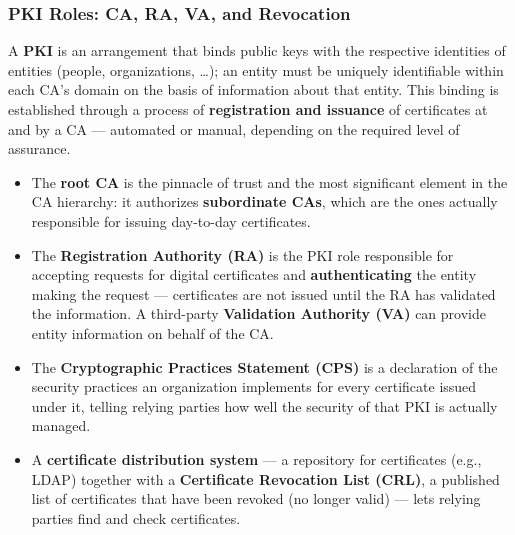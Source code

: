 \documentclass[12pt, a4paper]{article}
\begin{document}
\subsubsection{PKI Roles: CA, RA, VA, and Revocation}
A \textbf{PKI} is an arrangement that binds public keys with the respective identities of entities (people, organizations, \dots); an entity must be uniquely identifiable within each CA's domain on the basis of information about that entity. This binding is established through a process of \textbf{registration and issuance} of certificates at and by a CA --- automated or manual, depending on the required level of assurance.
\begin{itemize}
    \item The \textbf{root CA} is the pinnacle of trust and the most significant element in the CA hierarchy: it authorizes \textbf{subordinate CAs}, which are the ones actually responsible for issuing day-to-day certificates.
    \item The \textbf{Registration Authority (RA)} is the PKI role responsible for accepting requests for digital certificates and \textbf{authenticating} the entity making the request --- certificates are not issued until the RA has validated the information. A third-party \textbf{Validation Authority (VA)} can provide entity information on behalf of the CA.
    \item The \textbf{Cryptographic Practices Statement (CPS)} is a declaration of the security practices an organization implements for every certificate issued under it, telling relying parties how well the security of that PKI is actually managed.
    \item A \textbf{certificate distribution system} --- a repository for certificates (e.g., LDAP) together with a \textbf{Certificate Revocation List (CRL)}, a published list of certificates that have been revoked (no longer valid) --- lets relying parties find and check certificates.
\end{itemize}
\end{document}
